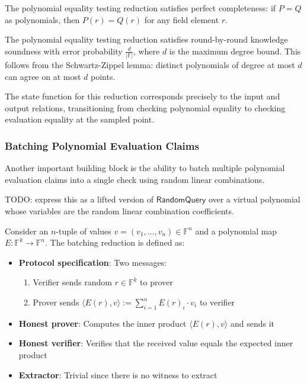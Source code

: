 \begin{theorem}
    The polynomial equality testing reduction satisfies perfect completeness: if $P = Q$ as polynomials, then $P(r) = Q(r)$ for any field element $r$.
\end{theorem}

\begin{theorem}
    The polynomial equality testing reduction satisfies round-by-round knowledge soundness with error probability $\frac{d}{|\mathbb{F}|}$, where $d$ is the maximum degree bound. This follows from the Schwartz-Zippel lemma: distinct polynomials of degree at most $d$ can agree on at most $d$ points.
\end{theorem}

The state function for this reduction corresponds precisely to the input and output relations, transitioning from checking polynomial equality to checking evaluation equality at the sampled point.

\subsubsection{Batching Polynomial Evaluation Claims}

Another important building block is the ability to batch multiple polynomial evaluation claims into a single check using random linear combinations.

TODO: express this as a lifted version of $\mathsf{RandomQuery}$ over a virtual polynomial whose
variables are the random linear combination coefficients.

\begin{definition}
    \label{def:batching_polynomial_evaluation}
    Consider an $n$-tuple of values $v = (v_1, \ldots, v_n) \in \mathbb{F}^n$ and a polynomial map $E : \mathbb{F}^k \to \mathbb{F}^n$. The batching reduction is defined as:
    \begin{itemize}
        \item \textbf{Protocol specification}: Two messages:
        \begin{enumerate}
            \item Verifier sends random $r \in \mathbb{F}^k$ to prover
            \item Prover sends $\langle E(r), v \rangle := \sum_{i=1}^n E(r)_i \cdot v_i$ to verifier
        \end{enumerate}
        \item \textbf{Honest prover}: Computes the inner product $\langle E(r), v \rangle$ and sends it
        \item \textbf{Honest verifier}: Verifies that the received value equals the expected inner product
        \item \textbf{Extractor}: Trivial since there is no witness to extract
    \end{itemize}
\end{definition}

